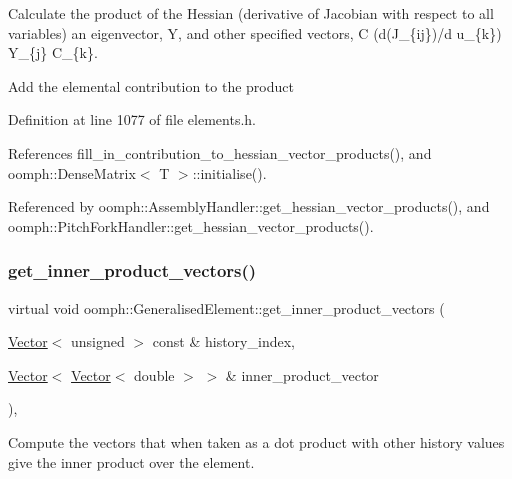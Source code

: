 Calculate the product of the Hessian (derivative of Jacobian with respect to all variables) an eigenvector, Y, and other specified vectors, C (d(J\+\_\+\{ij\})/d u\+\_\+\{k\}) Y\+\_\+\{j\} C\+\_\+\{k\}. 

Add the elemental contribution to the product 

Definition at line 1077 of file elements.\+h.



References fill\+\_\+in\+\_\+contribution\+\_\+to\+\_\+hessian\+\_\+vector\+\_\+products(), and oomph\+::\+Dense\+Matrix$<$ T $>$\+::initialise().



Referenced by oomph\+::\+Assembly\+Handler\+::get\+\_\+hessian\+\_\+vector\+\_\+products(), and oomph\+::\+Pitch\+Fork\+Handler\+::get\+\_\+hessian\+\_\+vector\+\_\+products().

\mbox{\label{classoomph_1_1GeneralisedElement_a464659c067a0bdd21f3314491a429381}} 
\subsubsection{\texorpdfstring{get\+\_\+inner\+\_\+product\+\_\+vectors()}{get\_inner\_product\_vectors()}}
{\footnotesize\ttfamily virtual void oomph\+::\+Generalised\+Element\+::get\+\_\+inner\+\_\+product\+\_\+vectors (\begin{DoxyParamCaption}\item[{\hyperlink{classoomph_1_1Vector}{Vector}$<$ unsigned $>$ const \&}]{history\+\_\+index,  }\item[{\hyperlink{classoomph_1_1Vector}{Vector}$<$ \hyperlink{classoomph_1_1Vector}{Vector}$<$ double $>$ $>$ \&}]{inner\+\_\+product\+\_\+vector }\end{DoxyParamCaption})\hspace{0.3cm}{\ttfamily [inline]}, {\ttfamily [virtual]}}



Compute the vectors that when taken as a dot product with other history values give the inner product over the element. 



